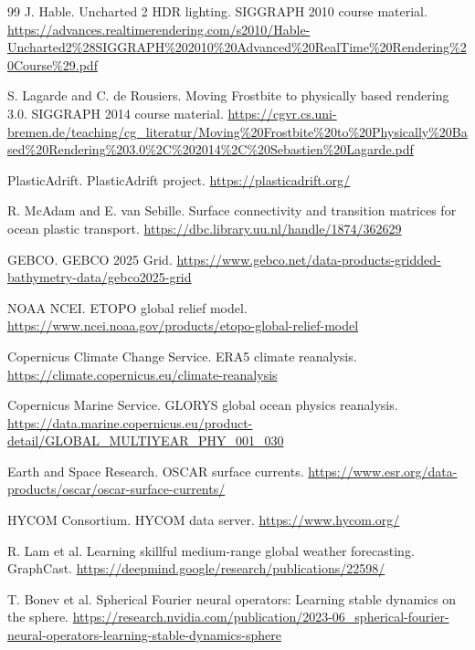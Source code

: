 \documentclass[11pt]{article}
\begin{document}
\begin{thebibliography}{99}
J. Hable.
\newblock Uncharted 2 HDR lighting.
\newblock SIGGRAPH 2010 course material.
\newblock \url{https://advances.realtimerendering.com/s2010/Hable-Uncharted2%28SIGGRAPH%202010%20Advanced%20RealTime%20Rendering%20Course%29.pdf}

S. Lagarde and C. de Rousiers.
\newblock Moving Frostbite to physically based rendering 3.0.
\newblock SIGGRAPH 2014 course material.
\newblock \url{https://cgvr.cs.uni-bremen.de/teaching/cg_literatur/Moving%20Frostbite%20to%20Physically%20Based%20Rendering%203.0%2C%202014%2C%20Sebastien%20Lagarde.pdf}

PlasticAdrift.
\newblock PlasticAdrift project.
\newblock \url{https://plasticadrift.org/}

R. McAdam and E. van Sebille.
\newblock Surface connectivity and transition matrices for ocean plastic transport.
\newblock \url{https://dbc.library.uu.nl/handle/1874/362629}

GEBCO.
\newblock GEBCO 2025 Grid.
\newblock \url{https://www.gebco.net/data-products-gridded-bathymetry-data/gebco2025-grid}

NOAA NCEI.
\newblock ETOPO global relief model.
\newblock \url{https://www.ncei.noaa.gov/products/etopo-global-relief-model}

Copernicus Climate Change Service.
\newblock ERA5 climate reanalysis.
\newblock \url{https://climate.copernicus.eu/climate-reanalysis}

Copernicus Marine Service.
\newblock GLORYS global ocean physics reanalysis.
\newblock \url{https://data.marine.copernicus.eu/product-detail/GLOBAL_MULTIYEAR_PHY_001_030}

Earth and Space Research.
\newblock OSCAR surface currents.
\newblock \url{https://www.esr.org/data-products/oscar/oscar-surface-currents/}

HYCOM Consortium.
\newblock HYCOM data server.
\newblock \url{https://www.hycom.org/}

R. Lam et al.
\newblock Learning skillful medium-range global weather forecasting.
\newblock GraphCast.
\newblock \url{https://deepmind.google/research/publications/22598/}

T. Bonev et al.
\newblock Spherical Fourier neural operators: Learning stable dynamics on the sphere.
\newblock \url{https://research.nvidia.com/publication/2023-06_spherical-fourier-neural-operators-learning-stable-dynamics-sphere}


\end{thebibliography}
\end{document}
